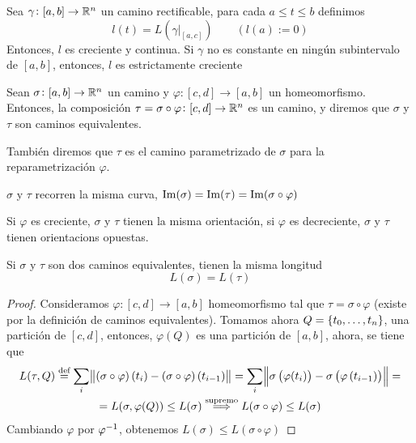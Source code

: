 \begin{prop}
    Sea $\gamma \colon [a,b] \to \mathbb{R}^n$ un camino rectificable, para cada $a \leq t \leq b$ definimos
    \[
        l(t) = L\left( \gamma\vert_{[a,c]} \right) \qquad (l(a) := 0)
    \]
    Entonces, $l$ es creciente y continua. Si $\gamma$ no es constante en ningún subintervalo de $[a,b]$,
    entonces, $l$ es estrictamente creciente
\end{prop}

\begin{defi}
    Sean $\sigma \colon [a, b] \to \mathbb{R}^n$ un camino y $\varphi \colon [c, d] \to [a, b]$ un homeomorfismo. Entonces,
    la composición $\tau = \sigma \circ \varphi \colon [c,d] \to \mathbb{R}^n$ es un camino, y diremos que $\sigma$ y $\tau$
    son caminos equivalentes.

    Tambi\'en diremos que $\tau$ es el camino parametrizado de $\sigma$ para la reparametrización $\varphi$.
\end{defi}

\begin{obs*}
    $\sigma$ y $\tau$ recorren la misma curva, $\operatorname{Im}(\sigma) = \operatorname{Im}(\tau) = \operatorname{Im}(\sigma \circ \varphi)$
\end{obs*}

\begin{obs}
    Si $\varphi$ es creciente, $\sigma$ y $\tau$ tienen la misma orientación, si $\varphi$ es decreciente,
    $\sigma$ y $\tau$ tienen orientacions opuestas.
\end{obs}

\begin{prop}
    Si $\sigma$ y $\tau$ son dos caminos equivalentes, tienen la misma longitud
    \[
        L(\sigma) = L(\tau)
    \]
\end{prop}

\begin{proof}
    Consideramos $\varphi \colon [c, d] \to [a, b]$ homeomorfismo tal que $\tau = \sigma \circ \varphi$
    (existe por la definición de caminos equivalentes). Tomamos ahora $Q = \left\{t_0, \dots, t_n\right\}$, una partición de $[c, d]$,
    entonces, $\varphi(Q)$ es una partición de $[a,b]$, ahora, se tiene que
    \begin{gather*}
        L(\tau, Q) \stackrel{\text{def}}{=} \sum_i \norm{(\sigma \circ \varphi) \left( t_i \right) - (\sigma \circ \varphi)\left( t_{i-1} \right)}
        = \sum_i \norm{\sigma\left( \varphi(t_i) \right) - \sigma\left( \varphi\left( t_{i-1} \right) \right)} = \\ =
        L(\sigma, \varphi(Q)) \leq L(\sigma) \stackrel{\text{supremo}}{\implies} L(\sigma \circ \varphi) \leq L(\sigma)
    \end{gather*}
    Cambiando $\varphi$ por $\varphi^{-1}$, obtenemos $L(\sigma) \leq L(\sigma \circ \varphi)$
\end{proof}

